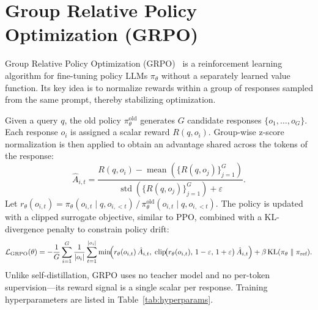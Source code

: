 \documentclass[11pt]{article}
\begin{document}
\section{Group Relative Policy Optimization (GRPO)}

Group Relative Policy Optimization (GRPO)~\cite{shao2024deepseekmath} is a reinforcement learning algorithm for fine-tuning policy LLMs $\pi_\theta$ without a separately learned value function. Its key idea is to normalize rewards within a group of responses sampled from the same prompt, thereby stabilizing optimization.

Given a query $q$, the old policy $\pi_{\theta}^{\text{old}}$ generates $G$ candidate responses $\{o_1, \dots, o_G\}$. Each response $o_i$ is assigned a scalar reward $R(q, o_i)$. Group-wise z-score normalization is then applied to obtain an advantage shared across the tokens of the response:
\[
\hat{A}_{i,t} = \frac{R(q, o_i) - \operatorname{mean}(\{R(q, o_j)\}_{j=1}^G)}
{\operatorname{std}(\{R(q, o_j)\}_{j=1}^G) + \varepsilon}.
\]
Let $r_\theta(o_{i,t}) = \pi_\theta(o_{i,t} \mid q, o_{i,<t}) \,/\, \pi_{\theta}^{\text{old}}(o_{i,t} \mid q, o_{i,<t})$. The policy is updated with a clipped surrogate objective, similar to PPO, combined with a KL-divergence penalty to constrain policy drift:
\[
\mathcal{L}_{\text{GRPO}}(\theta) = -\frac{1}{G}\sum_{i=1}^G \frac{1}{|o_i|}\sum_{t=1}^{|o_i|} \min\!\Bigl(
    r_\theta(o_{i,t})\,\hat{A}_{i,t},\;
    \operatorname{clip}\!\bigl(r_\theta(o_{i,t}),\, 1-\varepsilon,\, 1+\varepsilon\bigr)\,\hat{A}_{i,t}
\Bigr) + \beta\,\text{KL}(\pi_\theta \parallel \pi_{\text{ref}}).
\]
Unlike self-distillation, GRPO uses no teacher model and no per-token supervision---its reward signal is a single scalar per response. Training hyperparameters are listed in Table~\ref{tab:hyperparams}.
\end{document}
